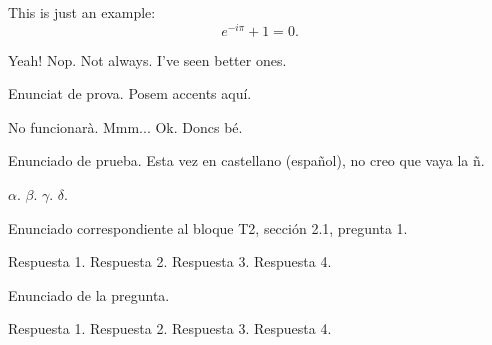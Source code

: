 This is just an example:
\begin{equation}
e^{-i\pi} + 1 = 0.
\end{equation}
\begin{enumerate}
\Myitem Yeah!
\Myitem Nop.
\Myitem Not always.
\Myitem I've seen better ones. %
\end{enumerate}

Enunciat de prova. Posem accents aquí.
\begin{enumerate}
\Myitem No funcionarà. %
\Myitem Mmm...
\Myitem Ok.
\Myitem Doncs bé.
\end{enumerate}

Enunciado de prueba. Esta vez en castellano (español), no creo que
vaya la ñ.
\begin{enumerate}
\Myitem $\alpha$. %
\Myitem $\beta$.
\Myitem $\gamma$.
\Myitem $\delta$.
\end{enumerate}

Enunciado correspondiente al bloque T2, sección 2.1, pregunta 1.
\begin{enumerate}
\Myitem Respuesta 1.%
\Myitem Respuesta 2.
\Myitem Respuesta 3.
\Myitem Respuesta 4.
\end{enumerate}

Enunciado de la pregunta.
\begin{enumerate}
\Myitem Respuesta 1.%
\Myitem Respuesta 2.
\Myitem Respuesta 3.
\Myitem Respuesta 4.
\end{enumerate}
